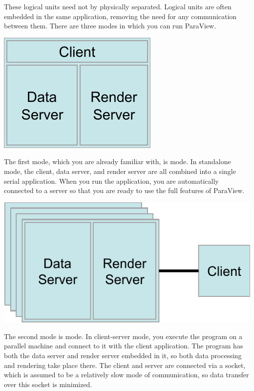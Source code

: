 These logical units need not by physically separated.  Logical units are
often embedded in the same application, removing the need for any
communication between them.  There are three modes in which you can run
ParaView.

\begin{inlinefig}
  \includegraphics[scale=\bbscale]{images/RunModeStandalone}
\end{inlinefig}

The first mode, which you are already familiar with, is
 mode.  In standalone mode, the client, data server,
and render server are all combined into a single serial application.  When
you run the  application, you are automatically connected
to a  server so that you are ready to use the full
features of ParaView.

\begin{inlinefig}
  \includegraphics[scale=\bbscale]{images/RunModeClientServer}
\end{inlinefig}

The second mode is  mode.  In client-server mode,
you execute the  program on a parallel machine and
connect to it with the  client application.  The
 program has both the data server and render server
embedded in it, so both data processing and rendering take place there.
The client and server are connected via a socket, which is assumed to be a
relatively slow mode of communication, so data transfer over this socket is
minimized.

